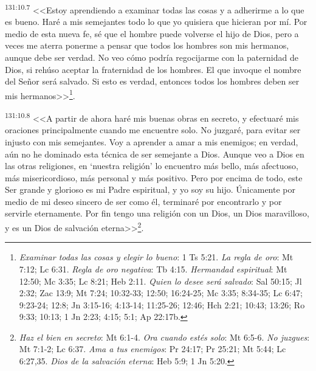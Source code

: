 \par 
\textsuperscript{131:10.7} <<Estoy aprendiendo a examinar todas las cosas y a adherirme a lo que es bueno. Haré a mis semejantes todo lo que yo quisiera que hicieran por mí. Por medio de esta nueva fe, sé que el hombre puede volverse el hijo de Dios, pero a veces me aterra ponerme a pensar que todos los hombres son mis hermanos, aunque debe ser verdad. No veo cómo podría regocijarme con la paternidad de Dios, si rehúso aceptar la fraternidad de los hombres. El que invoque el nombre del Señor será salvado. Si esto es verdad, entonces todos los hombres deben ser mis hermanos>>\footnote{\textit{Examinar todas las cosas y elegir lo bueno}: 1 Ts 5:21. \textit{La regla de oro}: Mt 7:12; Lc 6:31. \textit{Regla de oro negativa}: Tb 4:15. \textit{Hermandad espiritual}: Mt 12:50; Mc 3:35; Lc 8:21; Heb 2:11. \textit{Quien lo desee será salvado}: Sal 50:15; Jl 2:32; Zac 13:9; Mt 7:24; 10:32-33; 12:50; 16:24-25; Mc 3:35; 8:34-35; Lc 6:47; 9:23-24; 12:8; Jn 3:15-16; 4:13-14; 11:25-26; 12:46; Hch 2:21; 10:43; 13:26; Ro 9:33; 10:13; 1 Jn 2:23; 4:15; 5:1; Ap 22:17b.}.

\par 
\textsuperscript{131:10.8} <<A partir de ahora haré mis buenas obras en secreto, y efectuaré mis oraciones principalmente cuando me encuentre solo. No juzgaré, para evitar ser injusto con mis semejantes. Voy a aprender a amar a mis enemigos; en verdad, aún no he dominado esta técnica de ser semejante a Dios. Aunque veo a Dios en las otras religiones, en `nuestra religión' lo encuentro más bello, más afectuoso, más misericordioso, más personal y más positivo. Pero por encima de todo, este Ser grande y glorioso es mi Padre espiritual, y yo soy su hijo. Únicamente por medio de mi deseo sincero de ser como él, terminaré por encontrarlo y por servirle eternamente. Por fin tengo una religión con un Dios, un Dios maravilloso, y es un Dios de salvación eterna>>\footnote{\textit{Haz el bien en secreto}: Mt 6:1-4. \textit{Ora cuando estés solo}: Mt 6:5-6. \textit{No juzgues}: Mt 7:1-2; Lc 6:37. \textit{Ama a tus enemigos}: Pr 24:17; Pr 25:21; Mt 5:44; Lc 6:27,35. \textit{Dios de la salvación eterna}: Heb 5:9; 1 Jn 5:20.}.